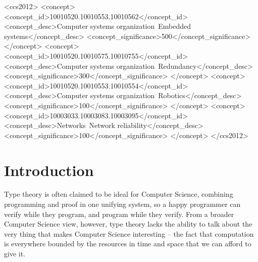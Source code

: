 \documentclass[acmsmall,review,screen,anonymous]{acmart}
\begin{document}
\begin{CCSXML}
<ccs2012>
 <concept>
  <concept_id>10010520.10010553.10010562</concept_id>
  <concept_desc>Computer systems organization~Embedded systems</concept_desc>
  <concept_significance>500</concept_significance>
 </concept>
 <concept>
  <concept_id>10010520.10010575.10010755</concept_id>
  <concept_desc>Computer systems organization~Redundancy</concept_desc>
  <concept_significance>300</concept_significance>
 </concept>
 <concept>
  <concept_id>10010520.10010553.10010554</concept_id>
  <concept_desc>Computer systems organization~Robotics</concept_desc>
  <concept_significance>100</concept_significance>
 </concept>
 <concept>
  <concept_id>10003033.10003083.10003095</concept_id>
  <concept_desc>Networks~Network reliability</concept_desc>
  <concept_significance>100</concept_significance>
 </concept>
</ccs2012>
\end{CCSXML}




\maketitle

\section{Introduction}
\label{sec:introduction}

Type theory is often claimed to be ideal for Computer Science,
combining programming and proof in one unifying system, so a happy
programmer can verify while they program, and program while they
verify. From a broader Computer Science view, however, type theory
lacks the ability to talk about the very thing that makes Computer
Science interesting -- the fact that computation is everywhere bounded
by the resources in time and space that we can afford to give it.
\end{document}
